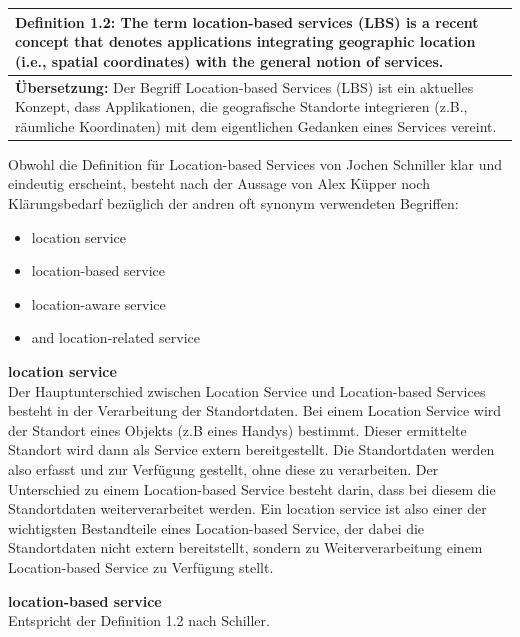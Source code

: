 \begin{table}[h]
	\centering
	\begin{tabular}{|p{16cm}|}\hline
		\textbf{Definition 1.2:} \glqq The term location-based services (LBS) is a recent concept that denotes applications integrating geographic location (i.e., spatial coordinates) with the general notion of services. \grqq \cite[S.1]{Schiller2004}\\ \hline
		\textbf{Übersetzung:} Der Begriff Location-based Services (LBS) ist ein aktuelles Konzept, dass Applikationen, die geografische Standorte integrieren (z.B., räumliche Koordinaten) mit dem eigentlichen Gedanken eines Services vereint. \\ \hline
	\end{tabular}
\end{table}

Obwohl die Definition für Location-based Services von Jochen Schniller klar und eindeutig erscheint, besteht nach der Aussage von Alex Küpper noch Klärungsbedarf bezüglich der andren oft synonym verwendeten Begriffen:
\begin{itemize}
\item location service
\item location-based service
\item location-aware service
\item and location-related service
\end{itemize}



\textbf{location service} \\
Der Hauptunterschied zwischen Location Service und Location-based Services besteht in der Verarbeitung der Standortdaten. Bei einem Location Service wird der Standort eines Objekts (z.B eines Handys) bestimmt. Dieser ermittelte Standort wird dann als Service extern bereitgestellt. Die Standortdaten werden also erfasst und zur Verfügung gestellt, ohne diese zu verarbeiten.
Der Unterschied zu einem Location-based Service besteht darin, dass bei diesem die Standortdaten weiterverarbeitet werden. Ein location service ist also einer der wichtigsten Bestandteile eines Location-based Service, der dabei die Standortdaten nicht extern bereitstellt, sondern zu Weiterverarbeitung einem Location-based Service zu Verfügung stellt.
\cite[S.1-2]{Kuepper2005}

\textbf{location-based service} \\
Entspricht der Definition 1.2 nach Schiller.


